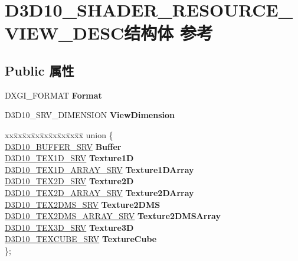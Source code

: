 \hypertarget{struct_d3_d10___s_h_a_d_e_r___r_e_s_o_u_r_c_e___v_i_e_w___d_e_s_c}{}\section{D3\+D10\+\_\+\+S\+H\+A\+D\+E\+R\+\_\+\+R\+E\+S\+O\+U\+R\+C\+E\+\_\+\+V\+I\+E\+W\+\_\+\+D\+E\+S\+C结构体 参考}
\label{struct_d3_d10___s_h_a_d_e_r___r_e_s_o_u_r_c_e___v_i_e_w___d_e_s_c}
\subsection*{Public 属性}
\begin{DoxyCompactItemize}
\item 
\mbox{\label{struct_d3_d10___s_h_a_d_e_r___r_e_s_o_u_r_c_e___v_i_e_w___d_e_s_c_a5cc1313d5b180ffe4f87bb8ceabdfe75}} 
D\+X\+G\+I\+\_\+\+F\+O\+R\+M\+AT {\bfseries Format}
\item 
\mbox{\label{struct_d3_d10___s_h_a_d_e_r___r_e_s_o_u_r_c_e___v_i_e_w___d_e_s_c_a002edbcf6fad38b73818e91d993f2b8c}} 
D3\+D10\+\_\+\+S\+R\+V\+\_\+\+D\+I\+M\+E\+N\+S\+I\+ON {\bfseries View\+Dimension}
\item 
\mbox{\label{struct_d3_d10___s_h_a_d_e_r___r_e_s_o_u_r_c_e___v_i_e_w___d_e_s_c_a9fd8965053a1fc442ccff305d6235657}} 
\begin{tabbing}
xx\=xx\=xx\=xx\=xx\=xx\=xx\=xx\=xx\=\kill
union \{\\
\>\hyperlink{struct_d3_d10___b_u_f_f_e_r___s_r_v}{D3D10\_BUFFER\_SRV} {\bfseries Buffer}\\
\>\hyperlink{struct_d3_d10___t_e_x1_d___s_r_v}{D3D10\_TEX1D\_SRV} {\bfseries Texture1D}\\
\>\hyperlink{struct_d3_d10___t_e_x1_d___a_r_r_a_y___s_r_v}{D3D10\_TEX1D\_ARRAY\_SRV} {\bfseries Texture1DArray}\\
\>\hyperlink{struct_d3_d10___t_e_x2_d___s_r_v}{D3D10\_TEX2D\_SRV} {\bfseries Texture2D}\\
\>\hyperlink{struct_d3_d10___t_e_x2_d___a_r_r_a_y___s_r_v}{D3D10\_TEX2D\_ARRAY\_SRV} {\bfseries Texture2DArray}\\
\>\hyperlink{struct_d3_d10___t_e_x2_d_m_s___s_r_v}{D3D10\_TEX2DMS\_SRV} {\bfseries Texture2DMS}\\
\>\hyperlink{struct_d3_d10___t_e_x2_d_m_s___a_r_r_a_y___s_r_v}{D3D10\_TEX2DMS\_ARRAY\_SRV} {\bfseries Texture2DMSArray}\\
\>\hyperlink{struct_d3_d10___t_e_x3_d___s_r_v}{D3D10\_TEX3D\_SRV} {\bfseries Texture3D}\\
\>\hyperlink{struct_d3_d10___t_e_x_c_u_b_e___s_r_v}{D3D10\_TEXCUBE\_SRV} {\bfseries TextureCube}\\
\}; \\


\end{tabbing}
\end{DoxyCompactItemize}
